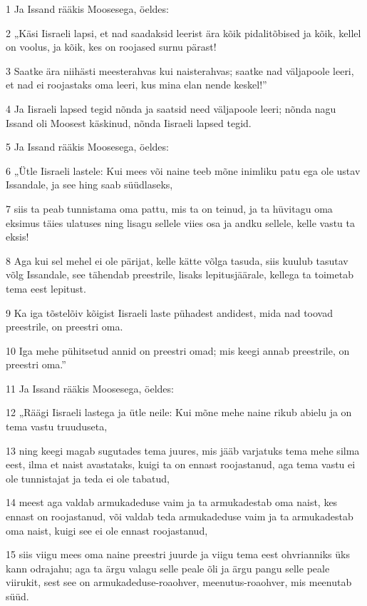 \par 1 Ja Issand rääkis Moosesega, öeldes:
\par 2 „Käsi Iisraeli lapsi, et nad saadaksid leerist ära kõik pidalitõbised ja kõik, kellel on voolus, ja kõik, kes on roojased surnu pärast!
\par 3 Saatke ära niihästi meesterahvas kui naisterahvas; saatke nad väljapoole leeri, et nad ei roojastaks oma leeri, kus mina elan nende keskel!”
\par 4 Ja Iisraeli lapsed tegid nõnda ja saatsid need väljapoole leeri; nõnda nagu Issand oli Moosest käskinud, nõnda Iisraeli lapsed tegid.
\par 5 Ja Issand rääkis Moosesega, öeldes:
\par 6 „Ütle Iisraeli lastele: Kui mees või naine teeb mõne inimliku patu ega ole ustav Issandale, ja see hing saab süüdlaseks,
\par 7 siis ta peab tunnistama oma pattu, mis ta on teinud, ja ta hüvitagu oma eksimus täies ulatuses ning lisagu sellele viies osa ja andku sellele, kelle vastu ta eksis!
\par 8 Aga kui sel mehel ei ole pärijat, kelle kätte võlga tasuda, siis kuulub tasutav võlg Issandale, see tähendab preestrile, lisaks lepitusjäärale, kellega ta toimetab tema eest lepitust.
\par 9 Ka iga tõstelõiv kõigist Iisraeli laste pühadest andidest, mida nad toovad preestrile, on preestri oma.
\par 10 Iga mehe pühitsetud annid on preestri omad; mis keegi annab preestrile, on preestri oma.”
\par 11 Ja Issand rääkis Moosesega, öeldes:
\par 12 „Räägi Iisraeli lastega ja ütle neile: Kui mõne mehe naine rikub abielu ja on tema vastu truuduseta,
\par 13 ning keegi magab sugutades tema juures, mis jääb varjatuks tema mehe silma eest, ilma et naist avastataks, kuigi ta on ennast roojastanud, aga tema vastu ei ole tunnistajat ja teda ei ole tabatud,
\par 14 meest aga valdab armukadeduse vaim ja ta armukadestab oma naist, kes ennast on roojastanud, või valdab teda armukadeduse vaim ja ta armukadestab oma naist, kuigi see ei ole ennast roojastanud,
\par 15 siis viigu mees oma naine preestri juurde ja viigu tema eest ohvrianniks üks kann odrajahu; aga ta ärgu valagu selle peale õli ja ärgu pangu selle peale viirukit, sest see on armukadeduse-roaohver, meenutus-roaohver, mis meenutab süüd.
